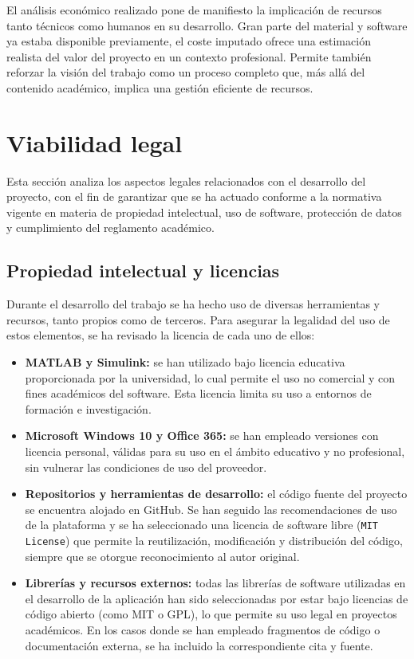 El análisis económico realizado pone de manifiesto la implicación de recursos tanto técnicos como humanos en su desarrollo. Gran parte del material y software ya estaba disponible previamente, el coste imputado ofrece una estimación realista del valor del proyecto en un contexto profesional. Permite también reforzar la visión del trabajo como un proceso completo que, más allá del contenido académico, implica una gestión eficiente de recursos.

\section{Viabilidad legal}

Esta sección analiza los aspectos legales relacionados con el desarrollo del proyecto, con el fin de garantizar que se ha actuado conforme a la normativa vigente en materia de propiedad intelectual, uso de software, protección de datos y cumplimiento del reglamento académico.

\subsection{Propiedad intelectual y licencias}

Durante el desarrollo del trabajo se ha hecho uso de diversas herramientas y recursos, tanto propios como de terceros. Para asegurar la legalidad del uso de estos elementos, se ha revisado la licencia de cada uno de ellos:

\begin{itemize}
    \item \textbf{MATLAB y Simulink:} se han utilizado bajo licencia educativa proporcionada por la universidad, lo cual permite el uso no comercial y con fines académicos del software. Esta licencia limita su uso a entornos de formación e investigación.
    \item \textbf{Microsoft Windows 10 y Office 365:} se han empleado versiones con licencia personal, válidas para su uso en el ámbito educativo y no profesional, sin vulnerar las condiciones de uso del proveedor.
    \item \textbf{Repositorios y herramientas de desarrollo:} el código fuente del proyecto se encuentra alojado en GitHub. Se han seguido las recomendaciones de uso de la plataforma y se ha seleccionado una licencia de software libre (\texttt{MIT License}) que permite la reutilización, modificación y distribución del código, siempre que se otorgue reconocimiento al autor original.
    \item \textbf{Librerías y recursos externos:} todas las librerías de software utilizadas en el desarrollo de la aplicación han sido seleccionadas por estar bajo licencias de código abierto (como MIT o GPL), lo que permite su uso legal en proyectos académicos. En los casos donde se han empleado fragmentos de código o documentación externa, se ha incluido la correspondiente cita y fuente.
\end{itemize}

